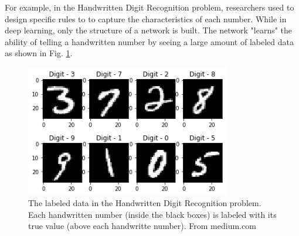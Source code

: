 For example, in the Handwritten Digit Recognition problem, researchers used to design specific rules to to capture the characteristics of each number. While in deep learning, only the structure of a network is built. The network "learns" the ability of telling a handwritten number by seeing a large amount of labeled data as shown in Fig. \ref{fig_dig_rec}.
\begin{figure}[!h]
\begin{center}
\includegraphics[width = 9cm]{img/digit_recog.png}
\caption{The labeled data in the Handwritten Digit Recognition problem. Each handwritten number (inside the black boxes) is labeled with its true value (above each handwritte number). From medium.com \label{fig_dig_rec}}
\end{center}
\end{figure}

